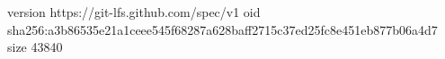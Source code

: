 version https://git-lfs.github.com/spec/v1
oid sha256:a3b86535e21a1ceee545f68287a628baff2715c37ed25fc8e451eb877b06a4d7
size 43840
